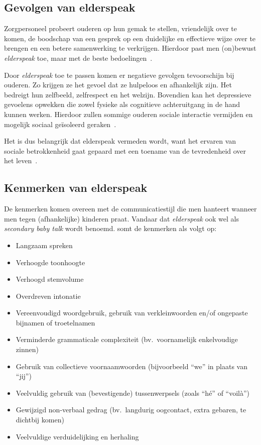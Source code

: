 \subsection{Gevolgen van elderspeak}
Zorgpersoneel probeert ouderen op hun gemak te stellen, vriendelijk over te komen, de boodschap van een gesprek op een duidelijke en effectieve wijze over te brengen en een betere samenwerking te verkrijgen. Hierdoor past men (on)bewust \textit{elderspeak} toe, maar met de beste bedoelingen~\autocite{Grimme2015}.

Door \textit{elderspeak} toe te passen komen er negatieve gevolgen tevoorschijn bij ouderen. Zo krijgen ze het gevoel dat ze hulpeloos en afhankelijk zijn. Het bedreigt hun zelfbeeld, zelfrespect en het welzijn. Bovendien kan het depressieve gevoelens opwekken die zowel fysieke als cognitieve achteruitgang in de hand kunnen werken. Hierdoor zullen sommige ouderen sociale interactie vermijden en mogelijk sociaal geïsoleerd geraken~\autocite{Williams2011a}.

Het is dus belangrijk dat elderspeak vermeden wordt, want het ervaren van sociale betrokkenheid gaat gepaard met een toename van de tevredenheid over het leven~\autocite{Williams2011a}.

\subsection{Kenmerken van elderspeak}
De kenmerken komen overeen met de communicatiestijl die men hanteert wanneer men tegen (afhankelijke) kinderen praat. Vandaar dat \textit{elderspeak} ook wel als \textit{secondary baby talk} wordt benoemd. \textcite{Campens2021} somt de kenmerken als volgt op:

\begin{itemize}
    \item Langzaam spreken
    \item Verhoogde toonhoogte
    \item Verhoogd stemvolume
    \item Overdreven intonatie
    \item Vereenvoudigd woordgebruik, gebruik van verkleinwoorden en/of ongepaste bijnamen of troetelnamen
    \item Verminderde grammaticale complexiteit (bv.\ voornamelijk enkelvoudige zinnen)
    \item Gebruik van collectieve voornaamwoorden (bijvoorbeeld ``we'' in plaats van ``jij'')
    \item Veelvuldig gebruik van (bevestigende) tussenwerpsels (zoals ``hé'' of ``voilà'')
    \item Gewijzigd non-verbaal gedrag (bv.\ langdurig oogcontact, extra gebaren, te dichtbij komen)
    \item Veelvuldige verduidelijking en herhaling
\end{itemize}

